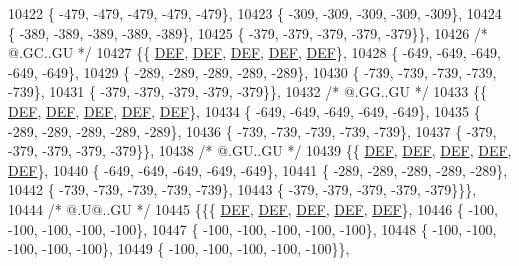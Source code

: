 \begin{DoxyCode}
10422 \{ -479, -479, -479, -479, -479\},
10423 \{ -309, -309, -309, -309, -309\},
10424 \{ -389, -389, -389, -389, -389\},
10425 \{ -379, -379, -379, -379, -379\}\},
10426 \textcolor{comment}{/*  @.GC..GU */}
10427 \{\{  \mbox{\hyperlink{1_88_84__epars_8h_a397419fc12b37ed479c8abb9d444d843}{DEF}},  \mbox{\hyperlink{1_88_84__epars_8h_a397419fc12b37ed479c8abb9d444d843}{DEF}},  \mbox{\hyperlink{1_88_84__epars_8h_a397419fc12b37ed479c8abb9d444d843}{DEF}},  \mbox{\hyperlink{1_88_84__epars_8h_a397419fc12b37ed479c8abb9d444d843}{DEF}},  \mbox{\hyperlink{1_88_84__epars_8h_a397419fc12b37ed479c8abb9d444d843}{DEF}}\},
10428 \{ -649, -649, -649, -649, -649\},
10429 \{ -289, -289, -289, -289, -289\},
10430 \{ -739, -739, -739, -739, -739\},
10431 \{ -379, -379, -379, -379, -379\}\},
10432 \textcolor{comment}{/*  @.GG..GU */}
10433 \{\{  \mbox{\hyperlink{1_88_84__epars_8h_a397419fc12b37ed479c8abb9d444d843}{DEF}},  \mbox{\hyperlink{1_88_84__epars_8h_a397419fc12b37ed479c8abb9d444d843}{DEF}},  \mbox{\hyperlink{1_88_84__epars_8h_a397419fc12b37ed479c8abb9d444d843}{DEF}},  \mbox{\hyperlink{1_88_84__epars_8h_a397419fc12b37ed479c8abb9d444d843}{DEF}},  \mbox{\hyperlink{1_88_84__epars_8h_a397419fc12b37ed479c8abb9d444d843}{DEF}}\},
10434 \{ -649, -649, -649, -649, -649\},
10435 \{ -289, -289, -289, -289, -289\},
10436 \{ -739, -739, -739, -739, -739\},
10437 \{ -379, -379, -379, -379, -379\}\},
10438 \textcolor{comment}{/*  @.GU..GU */}
10439 \{\{  \mbox{\hyperlink{1_88_84__epars_8h_a397419fc12b37ed479c8abb9d444d843}{DEF}},  \mbox{\hyperlink{1_88_84__epars_8h_a397419fc12b37ed479c8abb9d444d843}{DEF}},  \mbox{\hyperlink{1_88_84__epars_8h_a397419fc12b37ed479c8abb9d444d843}{DEF}},  \mbox{\hyperlink{1_88_84__epars_8h_a397419fc12b37ed479c8abb9d444d843}{DEF}},  \mbox{\hyperlink{1_88_84__epars_8h_a397419fc12b37ed479c8abb9d444d843}{DEF}}\},
10440 \{ -649, -649, -649, -649, -649\},
10441 \{ -289, -289, -289, -289, -289\},
10442 \{ -739, -739, -739, -739, -739\},
10443 \{ -379, -379, -379, -379, -379\}\}\},
10444 \textcolor{comment}{/*  @.U@..GU */}
10445 \{\{\{  \mbox{\hyperlink{1_88_84__epars_8h_a397419fc12b37ed479c8abb9d444d843}{DEF}},  \mbox{\hyperlink{1_88_84__epars_8h_a397419fc12b37ed479c8abb9d444d843}{DEF}},  \mbox{\hyperlink{1_88_84__epars_8h_a397419fc12b37ed479c8abb9d444d843}{DEF}},  \mbox{\hyperlink{1_88_84__epars_8h_a397419fc12b37ed479c8abb9d444d843}{DEF}},  \mbox{\hyperlink{1_88_84__epars_8h_a397419fc12b37ed479c8abb9d444d843}{DEF}}\},
10446 \{ -100, -100, -100, -100, -100\},
10447 \{ -100, -100, -100, -100, -100\},
10448 \{ -100, -100, -100, -100, -100\},
10449 \{ -100, -100, -100, -100, -100\}\},

\end{DoxyCode}
